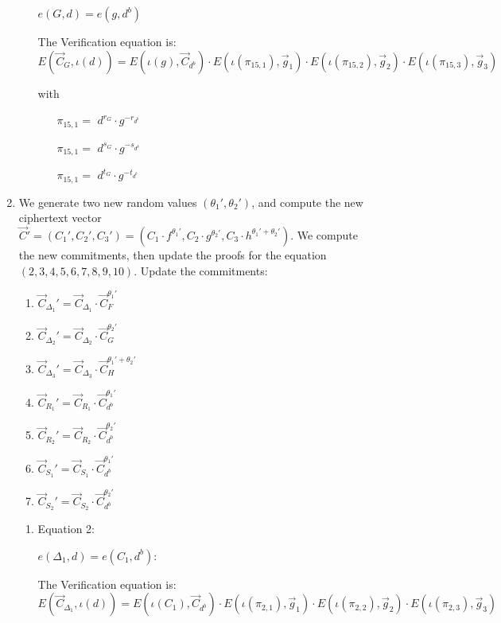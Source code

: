 \begin{description}
\begin{enumerate}
\begin{enumerate}
      $e(\boxed{G},d) = e(g, \boxed{d^b})$

      The Verification equation is: $E(\vec{C}_G, \iota(d)) = E(\iota(g), \vec{C}_{d^b}) \cdot E(\iota(\pi_{15,1}), \vec{g}_1)\cdot E(\iota(\pi_{15,2}), \vec{g}_2)\cdot E(\iota(\pi_{15,3}), \vec{g}_3)$

      with

      \begin{itemize}
      \item[$\pi_{15,1} = $] $d^{r_G} \cdot g^{-r_{d^b}}$    
      \item[$\pi_{15,1} = $] $d^{s_G} \cdot g^{-s_{d^b}}$    
      \item[$\pi_{15,1} = $] $d^{t_G} \cdot g^{-t_{d^b}}$
      \end{itemize}

    \end{enumerate}

  \item We generate two new random values $(\theta_1', \theta_2')$, and compute the new ciphertext vector $\vec{C}' = (C_1', C_2', C_3') = (C_1 \cdot f^{\theta_1'}, C_2 \cdot g^{\theta_2'}, C_3 \cdot h^{\theta_1'+\theta_2'})$. We compute the new commitments, then update the proofs for the equation $(2, 3, 4, 5, 6, 7, 8, 9, 10)$. Update the commitments:
    \begin{enumerate}
    \item $\vec{C}_{\Delta_1}' = \vec{C}_{\Delta_1} \cdot \vec{C}_{F}^{\theta_1'}$
    \item $\vec{C}_{\Delta_2}' = \vec{C}_{\Delta_2} \cdot \vec{C}_{G}^{\theta_2'}$
    \item $\vec{C}_{\Delta_3}' = \vec{C}_{\Delta_3} \cdot \vec{C}_{H}^{\theta_1' + \theta_2'}$
    \item $\vec{C}_{R_1}' = \vec{C}_{R_1} \cdot \vec{C}_{d^b}^{\theta_1'}$
    \item $\vec{C}_{R_2}' = \vec{C}_{R_2} \cdot \vec{C}_{d^b}^{\theta_2'}$
    \item $\vec{C}_{S_1}' = \vec{C}_{S_1} \cdot \vec{C}_{d^b}^{\theta_1'}$
    \item $\vec{C}_{S_2}' = \vec{C}_{S_2} \cdot \vec{C}_{d^b}^{\theta_2'}$
    \end{enumerate}
    \begin{enumerate}
    \item Equation 2:

      $e(\boxed{\Delta_1},d) = e(C_1, \boxed{d^b})$:
      
      The Verification equation is:  $E(\vec{C}_{\Delta_1}, \iota(d)) = E(\iota(C_1), \vec{C}_{d^b}) \cdot E(\iota(\pi_{2,1}), \vec{g}_1)\cdot E(\iota(\pi_{2,2}), \vec{g}_2)\cdot E(\iota(\pi_{2,3}), \vec{g}_3)$
      

\end{enumerate}
\end{enumerate}
\end{description}
